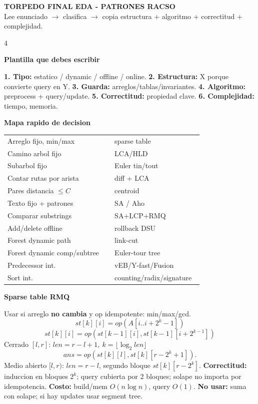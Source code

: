 \documentclass[8pt]{extarticle}
\newcommand{\blk}[2]{%
  \vspace{1.3pt}
  \noindent\colorbox{head}{\parbox{\linewidth-2\fboxsep}{\textbf{#1}}}\par
  {\footnotesize #2}\par
}
\newcommand{\mini}[1]{{\scriptsize #1}}
\newcommand{\bigO}{O}
\begin{document}
\scriptsize

\begin{center}
{\Large \textbf{TORPEDO FINAL EDA - PATRONES RACSO}}\\[-1pt]
\mini{Lee enunciado \(\to\) clasifica \(\to\) copia estructura + algoritmo + correctitud + complejidad.}
\end{center}

\begin{multicols}{4}

\blk{Plantilla que debes escribir}{
\textbf{1. Tipo:} estatico / dynamic / offline / online. 
\textbf{2. Estructura:} X porque convierte query en Y.
\textbf{3. Guarda:} arreglos/tablas/invariantes.
\textbf{4. Algoritmo:} preprocess + query/update.
\textbf{5. Correctitud:} propiedad clave.
\textbf{6. Complejidad:} tiempo, memoria.}

\blk{Mapa rapido de decision}{
\begin{tabular}{@{}p{0.52\linewidth}p{0.43\linewidth}@{}}
Arreglo fijo, min/max & sparse table\\
Camino arbol fijo & LCA/HLD\\
Subarbol fijo & Euler tin/tout\\
Contar rutas por arista & diff + LCA\\
Pares distancia \(\le C\) & centroid\\
Texto fijo + patrones & SA / Aho\\
Comparar substrings & SA+LCP+RMQ\\
Add/delete offline & rollback DSU\\
Forest dynamic path & link-cut\\
Forest dynamic comp/subtree & Euler-tour tree\\
Predecessor int. & vEB/Y-fast/Fusion\\
Sort int. & counting/radix/signature
\end{tabular}}

\blk{Sparse table RMQ}{
Usar si arreglo \textbf{no cambia} y op idempotente: min/max/gcd.
\[
st[k][i]=op(A[i..i+2^k-1])
\]
\[
st[k][i]=op(st[k-1][i],st[k-1][i+2^{k-1}])
\]
Cerrado \([l,r]\): \(len=r-l+1,\ k=\lfloor\log_2 len\rfloor\)
\[
ans=op(st[k][l],st[k][r-2^k+1]).
\]
Medio abierto \([l,r)\): \(len=r-l\), segundo bloque \(st[k][r-2^k]\).
\textbf{Correctitud:} induccion en bloques \(2^k\); query cubierta por 2 bloques; solape no importa por idempotencia.
\textbf{Costo:} build/mem \(\bigO(n\log n)\), query \(\bigO(1)\).
\textbf{No usar:} suma con solape; si hay updates usar segment tree.}


\end{multicols}
\end{document}
